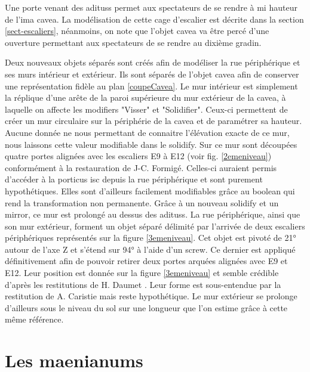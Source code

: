 Une porte venant des \glspl{aditus} permet aux spectateurs de se rendre à mi hauteur de l'\gls{ima cavea}. La modélisation de cette cage d'escalier est décrite dans la section \ref{sect-escaliers}, néanmoins, on note que l'objet \gls{cavea} va être percé d'une ouverture permettant aux spectateurs de se rendre au dixième gradin.

Deux nouveaux objets séparés sont créés afin de modéliser la rue périphérique et ses murs intérieur et extérieur. Ils sont séparés de l'objet \gls{cavea} afin de conserver une représentation fidèle au plan \ref{coupeCavea}. Le mur intérieur est simplement la réplique d'une arête de la paroi supérieure du mur extérieur de la \gls{cavea}, à laquelle on affecte les \glspl{modifier} "Visser" et "Solidifier". Ceux-ci permettent de créer un mur circulaire sur la périphérie de la \gls{cavea} et de paramétrer sa hauteur. Aucune donnée ne nous permettant de connaitre l'élévation exacte de ce mur, nous laissons cette valeur modifiable dans le \gls{solidify}. Sur ce mur sont découpées quatre portes alignées avec les escaliers E9 à E12 (voir fig. \ref{2emeniveau}) conformément à la restauration de J-C. Formigé. Celles-ci auraient permis d'accéder à la \gls{porticus isc} depuis la rue périphérique et sont purement hypothétiques. Elles sont d'ailleurs facilement modifiables grâce au \gls{boolean} qui rend la transformation non permanente. Grâce à un nouveau \gls{solidify} et un \gls{mirror}, ce mur est prolongé au dessus des \glspl{aditus}. La rue périphérique, ainsi que son mur extérieur, forment un objet séparé délimité par l'arrivée de deux escaliers périphériques représentés sur la figure \ref{3emeniveau}. Cet objet est pivoté de 21° autour de l'axe Z et s'étend sur 94° à l'aide d'un \gls{screw}. Ce dernier est appliqué définitivement afin de pouvoir retirer deux portes arquées alignées avec E9 et E12. Leur position est donnée sur la figure \ref{3emeniveau} et semble crédible d'après les restitutions de H. Daumet \cite[Pl. VII]{orangePl}. Leur forme est sous-entendue par la restitution de A. Caristie \cite[Pl. VI]{orangePl} mais reste hypothétique. Le mur extérieur se prolonge d'ailleurs sous le niveau du sol sur une longueur que l'on estime grâce à cette même référence. 


\section{Les  \glspl{maenianum}} \label{sect-maenianum}

